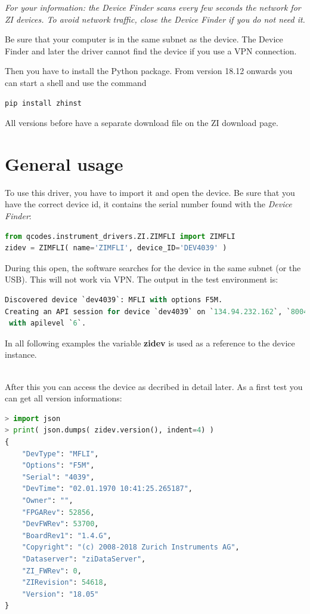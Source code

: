 \documentclass[11pt]{article} %
\begin{document}
{\it For your information: the Device Finder scans every few seconds the network for ZI devices. To avoid network traffic, close the Device Finder if you do not need it.}

Be sure that your computer is in the same subnet as the device. The Device Finder and later the driver cannot find the device if you use a VPN connection.

Then you have to install the Python package. From version 18.12 onwards you can start a shell and use the command
\begin{lstlisting}[frame=single]
pip install zhinst
\end{lstlisting}
All versions before have a separate download file on the ZI download page.

\clearpage


\section{General usage}

To use this driver, you have to import it and open the device. Be sure that you have the correct device id, it contains the serial number found with the {\it Device Finder}:

\begin{lstlisting}[frame=single, language=Python]
from qcodes.instrument_drivers.ZI.ZIMFLI import ZIMFLI
zidev = ZIMFLI( name='ZIMFLI', device_ID='DEV4039' )
\end{lstlisting}

During this open, the software searches for the device in the same subnet (or the USB). This will not work via VPN. The output in the test environment is:
\begin{lstlisting}[frame=single, language=Python]
Discovered device `dev4039`: MFLI with options F5M.
Creating an API session for device `dev4039` on `134.94.232.162`, `8004`
 with apilevel `6`.
\end{lstlisting}

In all following examples the variable {\bf zidev} is used as a reference to the device instance.

\ \\

After this you can access the device as decribed in detail later. As a first test you can get all version informations:
\begin{lstlisting}[frame=single, language=Python]
> import json
> print( json.dumps( zidev.version(), indent=4) )
{
    "DevType": "MFLI",
    "Options": "F5M",
    "Serial": "4039",
    "DevTime": "02.01.1970 10:41:25.265187",
    "Owner": "",
    "FPGARev": 52856,
    "DevFWRev": 53700,
    "BoardRev1": "1.4.G",
    "Copyright": "(c) 2008-2018 Zurich Instruments AG",
    "Dataserver": "ziDataServer",
    "ZI_FWRev": 0,
    "ZIRevision": 54618,
    "Version": "18.05"
}
\end{lstlisting}
\end{document}
